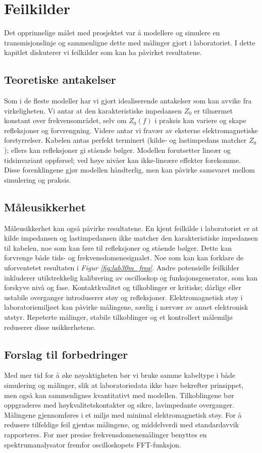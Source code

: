 \section{Feilkilder}
Det opprinnelige målet med prosjektet var å modellere og simulere en transmisjonslinje og sammenligne dette med målinger gjort i laboratoriet. I dette kapitlet diskuterer vi feilkilder som kan ha påvirket resultatene.

\subsection{Teoretiske antakelser}
Som i de fleste modeller har vi gjort idealiserende antakelser som kan avvike fra virkeligheten. Vi antar at den karakteristiske impedansen $Z_0$ er tilnærmet konstant over frekvensområdet, selv om $Z_0(f)$ i praksis kan variere og skape refleksjoner og forvrengning. Videre antar vi fravær av eksterne elektromagnetiske forstyrrelser. Kabelen antas perfekt terminert (kilde- og lastimpedans matcher $Z_0$); ellers kan refleksjoner gi stående bølger. Modellen forutsetter lineær og tidsinvariant oppførsel; ved høye nivåer kan ikke-lineære effekter forekomme. Disse forenklingene gjør modellen håndterlig, men kan påvirke samsvaret mellom simulering og praksis.

\subsection{Måleusikkerhet}
Måleusikkerhet kan også påvirke resultatene. En kjent feilkilde i laboratoriet er at kilde impedansen og lastimpedansen ikke matcher den karakteristiske impedansen til kabelen, noe som kan føre til refleksjoner og stående bølger. Dette kan forvrenge både tids- og frekvensdomenesignalet. Noe som kan kan forklare de uforventetet resultaten i \emph{Figur \ref{fig:lab30m_freq}}. Andre potensielle feilkilder inkluderer utilstrekkelig kalibrering av oscilloskop og funksjonsgenerator, som kan forskyve nivå og fase. Kontaktkvalitet og tilkoblinger er kritiske; dårlige eller ustabile overganger introduserer støy og refleksjoner. Elektromagnetisk støy i laboratoriemiljøet kan påvirke målingene, særlig i nærvær av annet elektronisk utstyr. Repeterte målinger, stabile tilkoblinger og et kontrollert målemiljø reduserer disse usikkerhetene.

\subsection{Forslag til forbedringer}
Med mer tid for å øke nøyaktigheten bør vi bruke samme kabeltype i både simulering og målinger, slik at laboratoriedata ikke bare bekrefter prinsippet, men også kan sammenlignes kvantitativt med modellen. Tilkoblingene bør oppgraderes med høykvalitetskontakter og sikre, lavimpedante overganger. Målingene gjennomføres i et miljø med minimal elektromagnetisk støy. For å redusere tilfeldige feil gjentas målingene, og middelverdi med standardavvik rapporteres. For mer presise frekvensdomenemålinger benyttes en spektrumanalysator fremfor oscilloskopets FFT-funksjon.
